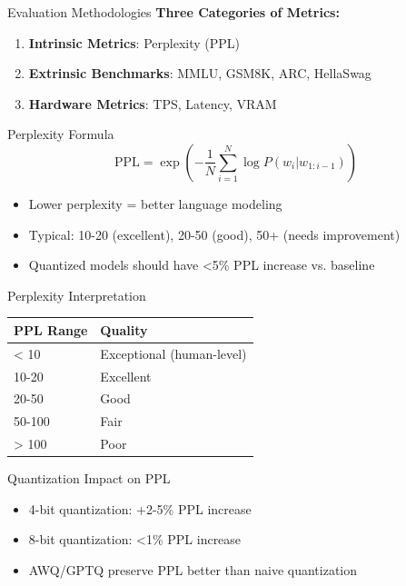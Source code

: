 \documentclass[aspectratio=169,10pt]{beamer}
\begin{document}
\begin{frame}{Evaluation Methodologies}
    \textbf{Three Categories of Metrics:}

    \vspace{0.3cm}
    \begin{enumerate}
        \item \textbf{Intrinsic Metrics}: Perplexity (PPL)
        \item \textbf{Extrinsic Benchmarks}: MMLU, GSM8K, ARC, HellaSwag
        \item \textbf{Hardware Metrics}: TPS, Latency, VRAM
    \end{enumerate}

    \vspace{0.5cm}
    \begin{block}{Perplexity Formula}
        $$\text{PPL} = \exp\left(-\frac{1}{N}\sum_{i=1}^{N}\log P(w_i|w_{1:i-1})\right)$$
        \begin{itemize}
            \item Lower perplexity = better language modeling
            \item Typical: 10-20 (excellent), 20-50 (good), 50+ (needs improvement)
            \item Quantized models should have <5\% PPL increase vs. baseline
        \end{itemize}
    \end{block}
\end{frame}

\begin{frame}{Perplexity Interpretation}
    \begin{table}
        \centering
        \small
        \begin{tabular}{ll}
            \toprule
            \textbf{PPL Range} & \textbf{Quality} \\
            \midrule
            < 10 & Exceptional (human-level) \\
            10-20 & Excellent \\
            20-50 & Good \\
            50-100 & Fair \\
            > 100 & Poor \\
            \bottomrule
        \end{tabular}
    \end{table}

    \vspace{0.5cm}
    \begin{block}{Quantization Impact on PPL}
        \begin{itemize}
            \item 4-bit quantization: +2-5\% PPL increase
            \item 8-bit quantization: <1\% PPL increase
            \item AWQ/GPTQ preserve PPL better than naive quantization
        \end{itemize}
    \end{block}
\end{frame}
\end{document}

